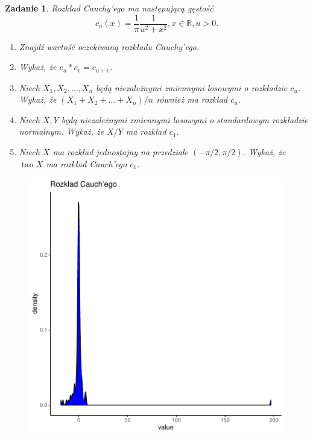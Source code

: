 \documentclass{mwart}
\newtheorem{zd}{Zadanie}
\begin{document}
\begin{zd}
Rozkład Cauchy'ego ma następującą gęstość
\begin{displaymath}
c_u(x) = \frac{1}{\pi}\frac{1}{u^2 + x^2}, x\in \mathbb{R}, u >0.
\end{displaymath}
\begin{enumerate}
\item Znajdź wartość oczekiwaną rozkładu Cauchy'ego.
\item Wykaż, że $c_u\ast c_v = c_{u+v}$.
\item Niech $X_1, X_2, \dots, X_n$ będą niezależnymi zmiennymi losowymi o rozkładzie $c_u$. Wykaż, że $(X_1+X_2+\dots +X_n)/n$ również ma rozkład $c_u$.
\item Niech $X, Y$ będą niezależnymi zmiennymi losowymi o standardowym rozkładzie normalnym. Wykaż, że $X/Y$ ma rozkład $c_1$.
\item Niech $X$ ma rozkład jednostajny na przedziale $(-\pi/2, \pi/2)$. Wykaż, że $\tan X$ ma rozkład Cauch'ego $c_1$.
\end{enumerate}
\begin{figure}
\includegraphics{Zestaw1_PS_2020-002}
\end{figure}
\end{zd}
\end{document}
